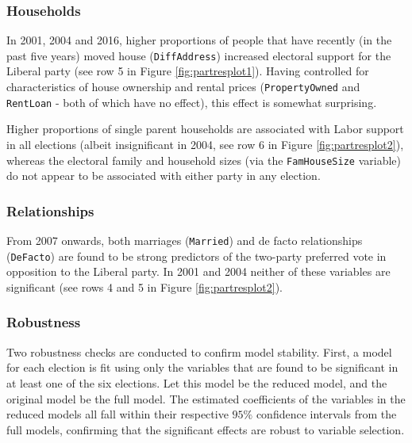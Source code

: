 \documentclass[times, doublespace]{anzsauth}
\begin{document}
\hypertarget{households}{%
\subsubsection*{Households}\label{households}}

In 2001, 2004 and 2016, higher proportions of people that have recently (in the past five years) moved house (\texttt{DiffAddress}) increased electoral support for the Liberal party (see row 5 in Figure \ref{fig:partresplot1}). Having controlled for characteristics of house ownership and rental prices (\texttt{PropertyOwned} and \texttt{RentLoan} - both of which have no effect), this effect is somewhat surprising.

Higher proportions of single parent households are associated with Labor support in all elections (albeit insignificant in 2004, see row 6 in Figure \ref{fig:partresplot2}), whereas the electoral family and household sizes (via the \texttt{FamHouseSize} variable) do not appear to be associated with either party in any election.

\hypertarget{relationships}{%
\subsubsection*{Relationships}\label{relationships}}

From 2007 onwards, both marriages (\texttt{Married}) and de facto relationships (\texttt{DeFacto}) are found to be strong predictors of the two-party preferred vote in opposition to the Liberal party. In 2001 and 2004 neither of these variables are significant (see rows 4 and 5 in Figure \ref{fig:partresplot2}).

\hypertarget{robustness}{%
\subsubsection{Robustness}\label{robustness}}

Two robustness checks are conducted to confirm model stability. First, a model for each election is fit using only the variables that are found to be significant in at least one of the six elections. Let this model be the reduced model, and the original model be the full model. The estimated coefficients of the variables in the reduced models all fall within their respective \(95\%\) confidence intervals from the full models, confirming that the significant effects are robust to variable selection.
\end{document}

